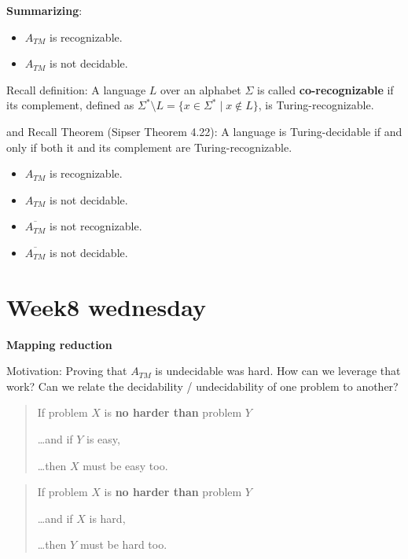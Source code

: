 \documentclass[12pt, oneside]{article}
\begin{document}
\vfill


\newpage

{\bf Summarizing}: 

\begin{itemize}
    \item $A_{TM}$  is recognizable.
    \item $A_{TM}$  is  not  decidable.
\end{itemize}

\vfill

Recall definition: A language $L$ over an  alphabet $\Sigma$ is called {\bf co-recognizable} if its complement,  defined
as $\Sigma^* \setminus L  = \{ x  \in  \Sigma^* \mid x \notin  L \}$, is Turing-recognizable.

and Recall  Theorem (Sipser Theorem 4.22): A  language is Turing-decidable if and only if both  it and its complement
are Turing-recognizable.

\vfill

\begin{itemize}
    \item $A_{TM}$  is recognizable.
    \item $A_{TM}$  is  not  decidable.
    \item $\overline{A_{TM}}$   is  not  recognizable.
    \item $\overline{A_{TM}}$   is  not  decidable.
\end{itemize}

\vfill \vfill
\section*{Week8 wednesday}


{\bf Mapping reduction}

Motivation: Proving that $A_{TM}$ is undecidable was hard. How can we leverage that work? 
Can we relate the decidability / undecidability of one problem to another?

\begin{quote}
If problem $X$ is {\bf no harder than} problem $Y$

\ldots and if $Y$ is easy,

\ldots then $X$ must be easy too.
\end{quote}


\begin{quote}
    If problem $X$ is {\bf no harder than} problem $Y$
    
    \ldots and if $X$ is hard,
    
    \ldots then $Y$ must be hard too.
\end{quote}
\end{document}
